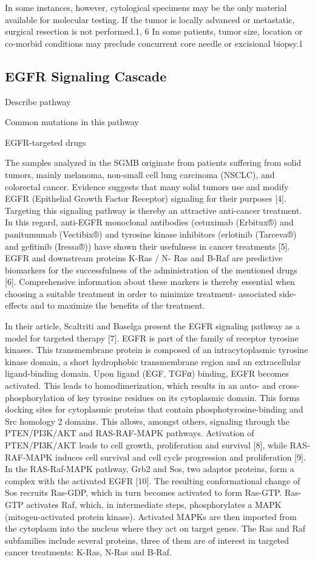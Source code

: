 In some instances, however, cytological specimens may be the only material available for molecular testing. If the tumor is locally advanced or metastatic, surgical resection is not performed.1, 6 In some patients, tumor size, location or co-morbid conditions may preclude concurrent core needle or excisional biopsy.1

\subsection{EGFR Signaling Cascade}

Describe pathway

Common mutations in this pathway

EGFR-targeted drugs

The samples analyzed in the SGMB originate from patients suffering from solid tumors, mainly melanoma, non-small cell lung carcinoma (NSCLC), and colorectal cancer. Evidence suggests that many solid tumors use and modify EGFR (Epithelial Growth Factor Receptor) signaling for their purposes [4]. Targeting this signaling pathway is thereby an attractive anti-cancer treatment. In this regard, anti-EGFR monoclonal antibodies (cetuximab (Erbitux®) and panitumumab (Vectibix®) and tyrosine kinase inhibitors (erlotinib (Tarceva®) and gefitinib (Iressa®)) have shown their usefulness in cancer treatments [5]. EGFR and downstream proteins K-Ras / N- Ras and B-Raf are predictive biomarkers for the successfulness of the administration of the mentioned drugs [6]. Comprehensive information about these markers is thereby essential when choosing a suitable treatment in order to minimize treatment- associated side-effects and to maximize the benefits of the treatment.

In their article, Scaltriti and Baselga present the EGFR signaling pathway as a model for targeted therapy [7]. EGFR is part of the family of receptor tyrosine kinases. This transmembrane protein is composed of an intracytoplasmic tyrosine kinase domain, a short hydrophobic transmembrane region and an extracellular ligand-binding domain. Upon ligand (EGF, TGFα) binding, EGFR becomes activated. This leads to homodimerization, which results in an auto- and cross-phosphorylation of key tyrosine residues on its cytoplasmic domain. This forms docking sites for cytoplasmic proteins that contain phosphotyrosine-binding and Src homology 2 domains. This allows, amongst others, signaling through the PTEN/PI3K/AKT and RAS-RAF-MAPK pathways. Activation of PTEN/PI3K/AKT leads to cell growth, proliferation and survival [8], while RAS-RAF-MAPK induces cell survival and cell cycle progression and proliferation [9]. In the RAS-Raf-MAPK pathway, Grb2 and Sos, two adaptor proteins, form a complex with the activated EGFR [10]. The resulting conformational change of Sos recruits Ras-GDP, which in turn becomes activated to form Ras-GTP. Ras-GTP activates Raf, which, in intermediate steps, phosphorylates a MAPK (mitogen-activated protein kinase). Activated MAPKs are then imported from the cytoplasm into the nucleus where they act on target genes. The Ras and Raf subfamilies include several proteins, three of them are of interest in targeted cancer treatments: K-Ras, N-Ras and B-Raf.

